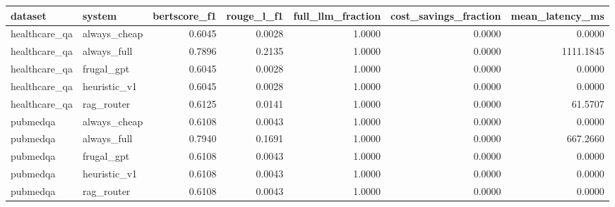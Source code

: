 \begin{tabular}{llrrrrr}
\toprule
dataset & system & bertscore_f1 & rouge_l_f1 & full_llm_fraction & cost_savings_fraction & mean_latency_ms \\
\midrule
healthcare_qa & always_cheap & 0.6045 & 0.0028 & 1.0000 & 0.0000 & 0.0000 \\
healthcare_qa & always_full & 0.7896 & 0.2135 & 1.0000 & 0.0000 & 1111.1845 \\
healthcare_qa & frugal_gpt & 0.6045 & 0.0028 & 1.0000 & 0.0000 & 0.0000 \\
healthcare_qa & heuristic_v1 & 0.6045 & 0.0028 & 1.0000 & 0.0000 & 0.0000 \\
healthcare_qa & rag_router & 0.6125 & 0.0141 & 1.0000 & 0.0000 & 61.5707 \\
pubmedqa & always_cheap & 0.6108 & 0.0043 & 1.0000 & 0.0000 & 0.0000 \\
pubmedqa & always_full & 0.7940 & 0.1691 & 1.0000 & 0.0000 & 667.2660 \\
pubmedqa & frugal_gpt & 0.6108 & 0.0043 & 1.0000 & 0.0000 & 0.0000 \\
pubmedqa & heuristic_v1 & 0.6108 & 0.0043 & 1.0000 & 0.0000 & 0.0000 \\
pubmedqa & rag_router & 0.6108 & 0.0043 & 1.0000 & 0.0000 & 0.0000 \\
\bottomrule
\end{tabular}
